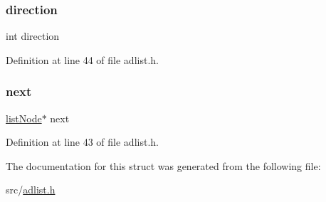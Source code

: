 \subsubsection{\texorpdfstring{direction}{direction}}
{\footnotesize\ttfamily int direction}



Definition at line 44 of file adlist.\+h.

\mbox{\label{structlist_iter_af8f3c30b0e82b384ff2f78d3e53b507f}} 
\subsubsection{\texorpdfstring{next}{next}}
{\footnotesize\ttfamily \hyperlink{structlist_node}{list\+Node}$\ast$ next}



Definition at line 43 of file adlist.\+h.



The documentation for this struct was generated from the following file\+:\begin{DoxyCompactItemize}
\item 
src/\hyperlink{adlist_8h}{adlist.\+h}\end{DoxyCompactItemize}
